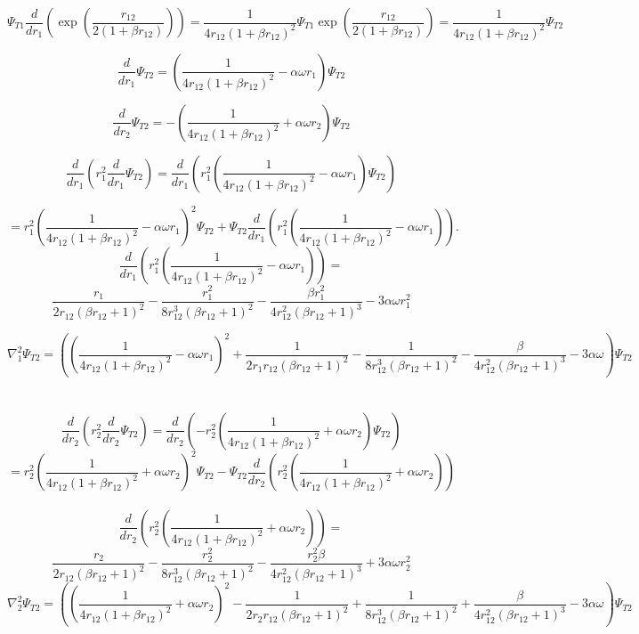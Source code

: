 \documentclass[10pt,a4paper]{article}
\begin{document}
\begin{equation*}
 \Psi_{T1}\frac{d}{dr_1}\left( \exp{\left(\frac{r_{12}}{2(1+\beta r_{12})}\right)}\right) = \frac{1}{4r_{12}\left( 1+\beta r_{12} \right)^2}  \Psi_{T1}\exp{\left(\frac{r_{12}}{2(1+\beta r_{12})}\right)} =  \frac{1}{4r_{12}\left( 1+\beta r_{12} \right)^2}\Psi_{T2}
\end{equation*}

\[
\frac{d}{dr_1}\Psi_{T2} = \left( \frac{1}{4r_{12}\left( 1+\beta r_{12} \right)^2} -\alpha \omega r_1\right)\Psi_{T2}
\]

\[
\frac{d}{dr_2}\Psi_{T2} = -\left( \frac{1}{4r_{12}\left( 1+\beta r_{12} \right)^2} +\alpha \omega r_2\right)\Psi_{T2}
\]

\[
\frac{d}{dr_1}\left( r_1^2 \frac{d}{dr_1}\Psi_{T2}\right) =  \frac{d}{dr_1}\left( r_1^2\left( \frac{1}{4r_{12}\left( 1+\beta r_{12} \right)^2} -\alpha \omega r_1\right)\Psi_{T2} \right)
\]

\[
= r_1^2\left( \frac{1}{4r_{12}\left( 1+\beta r_{12} \right)^2} -\alpha \omega r_1\right)^2\Psi_{T2}+\Psi_{T2} \frac{d}{dr_1}\left( r_1^2\left( \frac{1}{4r_{12}\left( 1+\beta r_{12} \right)^2} -\alpha \omega r_1\right)\right).
\]
\[
\frac{d}{dr_1}\left( r_1^2\left( \frac{1}{4r_{12}\left( 1+\beta r_{12} \right)^2} -\alpha \omega r_1\right)\right)=
\]
\[
\dfrac{r_1}{2r_{12}\left(\beta r_{12}+1\right)^2}-\dfrac{r_1^2}{8r_{12}^3\left(\beta r_{12}+1\right)^2}-\dfrac{\beta r_1^2}{4r_{12}^2\left(\beta r_{12}+1\right)^3}-3\alpha \omega r_1^2
\]

\[
\nabla_1^2\Psi_{T2} = \left( \left( \frac{1}{4r_{12}\left( 1+\beta r_{12} \right)^2} -\alpha \omega r_1\right)^2 +\dfrac{1}{2r_1r_{12}\left(\beta r_{12}+1\right)^2}-\dfrac{1}{8r_{12}^3\left(\beta r_{12}+1\right)^2}-\dfrac{\beta}{4r_{12}^2\left(\beta r_{12}+1\right)^3}-3\alpha \omega \right)\Psi_{T2}
\]
\\\\
\[
\frac{d}{dr_2}\left( r_2^2 \frac{d}{dr_2}\Psi_{T2}\right) =  \frac{d}{dr_2}\left( -r_2^2\left( \frac{1}{4r_{12}\left( 1+\beta r_{12} \right)^2} +\alpha \omega r_2\right)\Psi_{T2} \right)
\]
\[
= r_2^2\left( \frac{1}{4r_{12}\left( 1+\beta r_{12} \right)^2} +\alpha \omega r_2\right)^2\Psi_{T2} - \Psi_{T2}\frac{d}{dr_2}\left( r_2^2\left( \frac{1}{4r_{12}\left( 1+\beta r_{12} \right)^2} +\alpha \omega r_2\right) \right)
\]\\
\[
\frac{d}{dr_2}\left( r_2^2\left( \frac{1}{4r_{12}\left( 1+\beta r_{12} \right)^2} +\alpha \omega r_2\right) \right) = 
\]
\[
\dfrac{r_2}{2r_{12}\left(\beta r_{12}+1\right)^2}-\dfrac{r_2^2}{8r_{12}^3\left(\beta r_{12}+1\right)^2}-\dfrac{r_2^2\beta}{4r_{12}^2\left(\beta r_{12}+1\right)^3}+3\alpha \omega r_2^2
\]
\[
\nabla_2^2\Psi_{T2} = \left( \left( \frac{1}{4r_{12}\left( 1+\beta r_{12} \right)^2} +\alpha \omega r_2\right)^2 -   \dfrac{1}{2r_2r_{12}\left(\beta r_{12}+1\right)^2}+\dfrac{1}{8r_{12}^3\left(\beta r_{12}+1\right)^2}+\dfrac{\beta}{4r_{12}^2\left(\beta r_{12}+1\right)^3}-3\alpha \omega \right)\Psi_{T2}
\]
\end{document}
